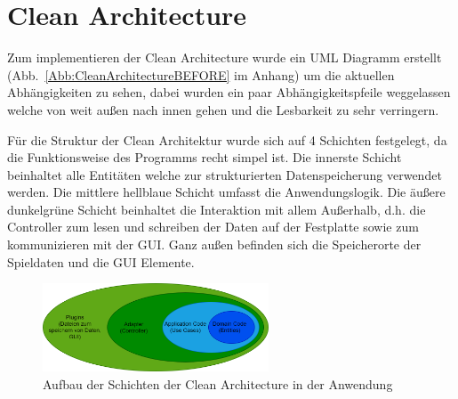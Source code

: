 \chapter{Clean Architecture}\label{cleanArchitecture}

Zum implementieren der Clean Architecture wurde ein UML Diagramm erstellt (Abb.~\ref{Abb:CleanArchitectureBEFORE} im Anhang) um die aktuellen Abhängigkeiten zu sehen, dabei wurden ein paar Abhängigkeitspfeile weggelassen welche von weit außen nach innen gehen und die Lesbarkeit zu sehr verringern. 


Für die Struktur der Clean Architektur wurde sich auf 4 Schichten festgelegt, da die Funktionsweise des Programms recht simpel ist. Die innerste Schicht beinhaltet alle Entitäten welche zur strukturierten Datenspeicherung verwendet werden. Die mittlere hellblaue Schicht umfasst die Anwendungslogik. Die äußere dunkelgrüne Schicht beinhaltet die Interaktion mit allem Außerhalb, d.h. die Controller zum lesen und schreiben der Daten auf der Festplatte sowie zum kommunizieren mit der GUI. Ganz außen befinden sich die Speicherorte der Spieldaten und die GUI Elemente. 


\begin{figure}[!ht]
  \centering
  \includegraphics[width=0.6\textwidth]{Bilder/ArchitekturSchichten.PNG}
  \caption{Aufbau der Schichten der Clean Architecture in der Anwendung}
  \label{Abb:ArchitekturSchichten}
\end{figure}

